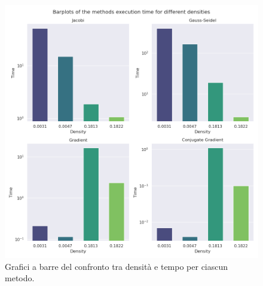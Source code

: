 \documentclass[12pt]{article}
\begin{document}
\begin{figure}[!ht]
    \begin{center}
    \includegraphics[scale=0.6]{images/density-time_barplots.png}
    \caption{Grafici a barre del confronto tra densità e tempo per ciascun metodo.}
    \label{fig:dt-b}
    \end{center}
\end{figure}
\end{document}
